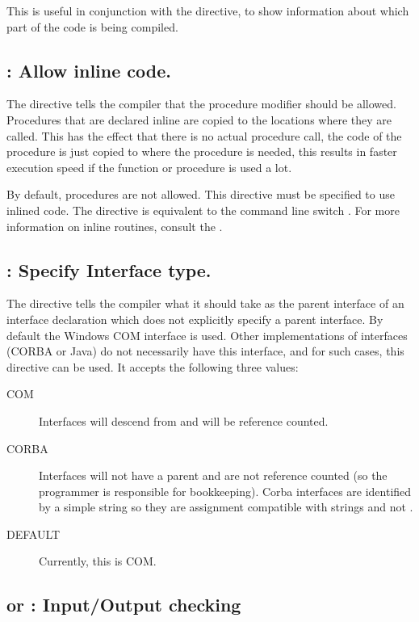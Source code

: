 This is useful in conjunction with the  directive, to show
information about which part of the code is being compiled.

\subsection{ : Allow inline code.}

The  directive tells the compiler that the 
procedure modifier should be allowed. Procedures that are declared inline
are copied to the locations where they are called. This has the effect that
there is no actual procedure call, the code of the procedure is just copied
to where the procedure is needed, this results in faster execution speed if
the function or procedure is used a lot.

By default,  procedures are not allowed. This directive must be 
specified to use inlined code. The directive is equivalent to the command line
 switch . For more information on inline routines, consult the .

\subsection{ : Specify Interface type.}
The  directive tells the compiler what it should take
as the parent interface of an interface declaration which does not
explicitly specify a parent interface. By default the Windows COM 
interface is used. Other implementations of interfaces (CORBA or Java) do
not necessarily have this interface, and for such cases, this directive can
be used. It accepts the following three values:
\begin{description}
\item[COM] Interfaces will descend from  and will be reference
counted.
\item[CORBA] Interfaces will not have a parent and are not reference
counted (so the programmer is responsible for bookkeeping). 
Corba interfaces are identified by a simple string so they are assignment compatible 
with strings and not .
\item[DEFAULT] Currently, this is COM.
\end{description}

\subsection{ or  : Input/Output checking}


